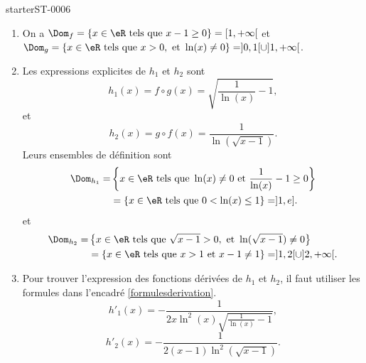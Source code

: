 
\begin{corrige}{starterST-0006}

\begin{enumerate}
\item On a $\Dom_f = \{x\in\eR \text{ tels que } x-1\geq 0\} = [1, +\infty[$ et  $\Dom_g = \{x\in\eR \text{ tels que } x> 0, \text{ et } \ln(x)\neq 0\} = ]0,1[\cup]1, +\infty[$.
\item Les expressions explicites de $h_1$ et $h_2$ sont 
\[
h_1 (x) = f\circ g (x) = \sqrt{\frac{1}{\ln(x)} -1},
\]
et 
\[
h_2(x)=g\circ f (x)=\frac{1}{\ln\left(\sqrt{x-1}\right)}.
\]
Leurs ensembles de définition sont 
\begin{equation*}  
  \begin{aligned}
    \Dom_{h_1} =& \left\{x\in\eR \text{ tels que }  \ln(x)\neq 0  \text{ et }\frac{1}{\ln(x)}-1\geq 0\right\}\\
    & = \left\{x\in\eR \text{ tels que } 0 <\ln(x)\leq 1\right\}  = ]1, e]. 
  \end{aligned}
\end{equation*}
et 
\begin{equation*}
  \begin{aligned}
    \Dom_{h_2} =& \left\{x\in\eR \text{ tels que }  \sqrt{x-1}> 0, \text{ et } \ln(\sqrt{x-1})\neq 0 \right\}\\
    & = \left\{x\in\eR \text{ tels que } x>1 \text{ et } x-1\neq 1\right\}  = ]1,2[\cup]2,+\infty[. 
  \end{aligned}
\end{equation*}
\item Pour trouver l'expression des fonctions dérivées de $h_1$ et $h_2$, il faut utiliser les formules dans l'encadré \ref{formulesderivation}. 
  \begin{equation*}
    h'_1(x) = -\frac{1}{2x\ln^2(x)\sqrt{\frac{1}{\ln(x)} -1}},
  \end{equation*}
  \begin{equation*}
   h'_2(x) = -  \frac{1}{2(x-1)\ln^2(\sqrt{x-1})}.
  \end{equation*}
\end{enumerate}
   


\end{corrige}


